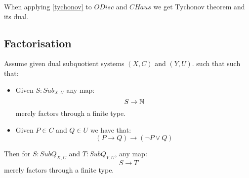 When applying \cref{tychonov} to $ODisc$ and $CHaus$ we get Tychonov theorem and its dual.


\subsection{Factorisation}

\begin{proposition}\label{factorisation-subquotient}
Assume given dual subquotient systems $(X,C)$ and $(Y,U)$. such that
such that:
\begin{itemize}
\item Given $S:Sub_{X,U}$ any map:
\[S\to \mathbb{N}\]
merely factors through a finite type.
\item Given $P\in C$ and $Q\in U$ we have that:
\[(P\to Q) \to (\neg P \lor Q)\]
\end{itemize}
Then for $S:SubQ_{X,C}$ and $T:SubQ_{Y,U}$, any map:
\[S\to T\]
merely factors through a finite type.
\end{proposition}


